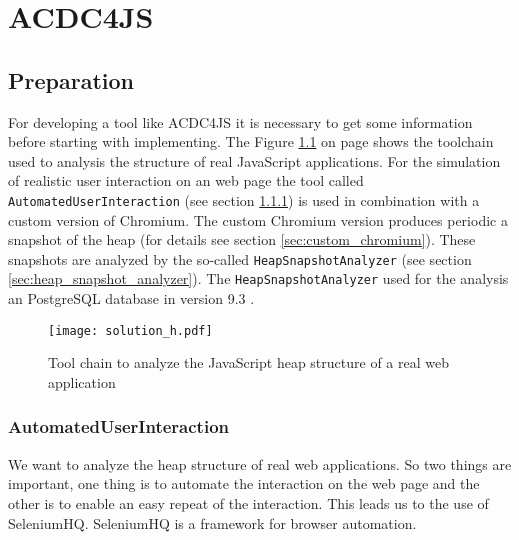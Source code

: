 %
%

\chapter{ACDC4JS}

\section{Preparation}
	For developing a tool like ACDC4JS it is necessary to get some information before starting with implementing. The Figure \ref{fig:heap_structure_analysis} on page \pageref{fig:heap_structure_analysis} shows the toolchain used to analysis the structure of real JavaScript applications. For the simulation of realistic user interaction on an web page the tool called \texttt{AutomatedUserInteraction} (see section \ref{sec:automated_user_interaction}) is used in combination with a custom version of Chromium. The custom Chromium version produces periodic a snapshot of the heap (for details see section \ref{sec:custom_chromium}). These snapshots are analyzed by the so-called \texttt{HeapSnapshotAnalyzer} (see section \ref{sec:heap_snapshot_analyzer}). The \texttt{HeapSnapshotAnalyzer} used for the analysis an PostgreSQL database in version 9.3 \cite{Psql13}.

	\begin{figure}
		\texttt{[image: solution\_h.pdf]}
		\caption{Tool chain to analyze the JavaScript heap structure of a real web application}
		\label{fig:heap_structure_analysis}
	\end{figure}

	\subsection{AutomatedUserInteraction} \label{sec:automated_user_interaction}
		We want to analyze the heap structure of real web applications. So two things are important, one thing is to automate the interaction on the web page and the other is to enable an easy repeat of the interaction. This leads us to the use of SeleniumHQ\cite{Sele13}. SeleniumHQ is a framework for browser automation. 

		\

